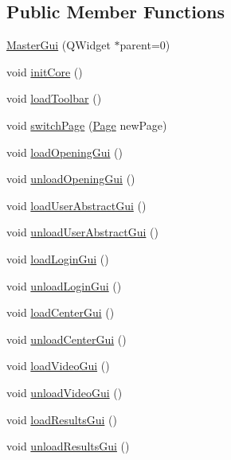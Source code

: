 \subsection*{Public Member Functions}
\begin{DoxyCompactItemize}
\item 
\hyperlink{class_master_gui_a661a3bdba67b40b286cc5d03f102a5fa}{Master\-Gui} (Q\-Widget $\ast$parent=0)
\item 
void \hyperlink{class_master_gui_a7f49d299b2139b827b29e7090c007b93}{init\-Core} ()
\item 
void \hyperlink{class_master_gui_acbb009f39bcb1ccc3829cbb1849887f7}{load\-Toolbar} ()
\item 
void \hyperlink{class_master_gui_a72a87c03cd2c7be58098e5c0902a43a2}{switch\-Page} (\hyperlink{class_master_gui_af69d22eb6d94d0c4f1291814e56f3d9f}{Page} new\-Page)
\item 
void \hyperlink{class_master_gui_ad7eb9322569582cd288da7212c89d2cc}{load\-Opening\-Gui} ()
\item 
void \hyperlink{class_master_gui_aa5276df266adf8b4b58edfb9b3df24e3}{unload\-Opening\-Gui} ()
\item 
void \hyperlink{class_master_gui_a918f12800f13f7c582a84e9d0a407e89}{load\-User\-Abstract\-Gui} ()
\item 
void \hyperlink{class_master_gui_a52a6841a6cf39acea335a89823af0380}{unload\-User\-Abstract\-Gui} ()
\item 
void \hyperlink{class_master_gui_aa66838cb8411174f17ad6022bb6da0a3}{load\-Login\-Gui} ()
\item 
void \hyperlink{class_master_gui_ab944aa39cdd748b94d1d96da952b85bb}{unload\-Login\-Gui} ()
\item 
void \hyperlink{class_master_gui_aa0fa6cf571cab286c77d16dd904e5d7b}{load\-Center\-Gui} ()
\item 
void \hyperlink{class_master_gui_a98fe5e5c3faef0cc42c68bb3acc4ae40}{unload\-Center\-Gui} ()
\item 
void \hyperlink{class_master_gui_aad475ba377d712fb3f3159b35a44dcd5}{load\-Video\-Gui} ()
\item 
void \hyperlink{class_master_gui_ad1e812ae66f5e22e243af122576d7a54}{unload\-Video\-Gui} ()
\item 
void \hyperlink{class_master_gui_a269c64be1b91cf8fd9b514e14ef0f61c}{load\-Results\-Gui} ()
\item 
void \hyperlink{class_master_gui_ae528dcddc5c9cacfb2da4ed2fd73c918}{unload\-Results\-Gui} ()
\item 

\end{DoxyCompactItemize}
